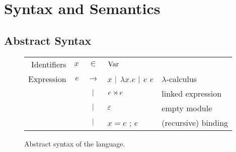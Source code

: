 \section{Syntax and Semantics}
\subsection{Abstract Syntax}
\begin{figure}[htb]
  \centering
  \begin{tabular}{rrcll}
    Identifiers & $x$ & $\in$         & $\text{Var}$                                                      \\
    Expression  & $e$ & $\rightarrow$ & $x$ $|$ $\lambda x.e$ $|$ $e$ $e$ & $\lambda$-calculus  \\
                &     & $|$       & ${e}\rtimes{e}$                             & linked expression   \\
                &     & $|$       & $\varepsilon$                             & empty module        \\
                &     & $|$       & $x=e$ ; $e$                               & (recursive) binding
  \end{tabular}
  \caption{Abstract syntax of the language.}
  \label{fig:syntax}
\end{figure}
